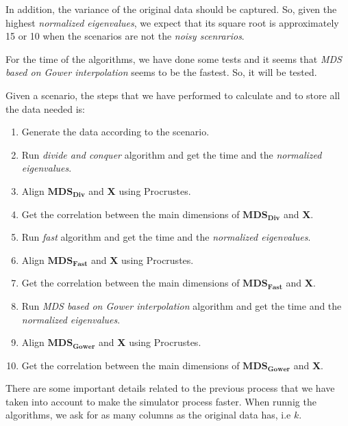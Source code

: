 \documentclass[11pt]{report}
\begin{document}
\indent In addition, the variance of the original data should be captured. 
So, given the highest \textit{normalized eigenvalues}, we expect that 
its square root is approximately 15 or 10 when the scenarios are not the 
\textit{noisy scenrarios}. 

\indent For the time of the algorithms, we have done some tests and it seems 
that \textit{MDS based on Gower interpolation} seems to be the fastest.
So, it will be tested.


\indent Given a scenario, the steps that we have performed to calculate  and to
store all the data needed is:

\begin{enumerate}

\item Generate the data according to the scenario. 

\item Run \textit{divide and conquer} algorithm and get the time and the 
\textit{normalized eigenvalues}.

\item Align $\mathbf{MDS_{Div}}$ and \textbf{X} using Procrustes.

\item Get the correlation between the main dimensions of $\mathbf{MDS_{Div}}$ 
and \textbf{X}.

\item Run \textit{fast} algorithm and get the time and the 
\textit{normalized eigenvalues}.

\item Align $\mathbf{MDS_{Fast}}$ and \textbf{X} using Procrustes.

\item Get the correlation between the main dimensions of $\mathbf{MDS_{Fast}}$ 
and \textbf{X}.

\item Run \textit{MDS based on Gower interpolation} algorithm and get the 
time and the \textit{normalized eigenvalues}.

\item Align $\mathbf{MDS_{Gower}}$ and \textbf{X} using Procrustes.

\item Get the correlation between the main dimensions of $\mathbf{MDS_{Gower}}$ 
and \textbf{X}.

\end{enumerate}


\indent There are some important details related to the previous process that 
we have taken into account to make the simulator process faster. When runnig 
the algorithms, we ask for as many columns as the original data has, i.e $k$.
\end{document}
